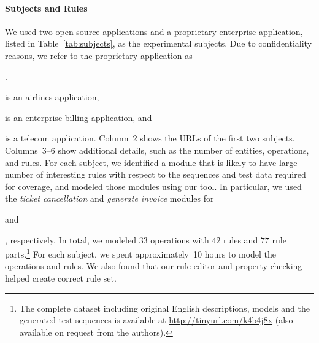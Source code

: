 
\paragraph*{Subjects and Rules} We used two open-source applications and a proprietary enterprise application,
listed in Table~\ref{tab:subjects}, as the experimental subjects. Due to
confidentiality reasons, we refer to the proprietary application as
\subject{App}. \subject{Cebu-pacific} is an airlines application,
\subject{jBilling} is an enterprise billing application, and \subject{App} is a
telecom application. Column~2 shows the URLs of the first two subjects.
Columns~3--6 show additional details, such as the number of entities,
operations, and rules. For each subject, we identified a module that is likely
to have large number of interesting rules with respect to the sequences and test
data required for coverage, and modeled those modules using our tool. In
particular, we used the \textit{ticket cancellation} and \textit{generate
  invoice} modules for \subject{Cebu-pacific} and \subject{jBilling},
respectively. In total, we modeled $33$ operations with $42$ rules and $77$ rule
parts.\footnote{\small The complete dataset including original English descriptions, models and the
  generated test sequences is available at \url{http://tinyurl.com/k4b4j8x}
  (also available on request from the authors).} For each subject, we spent
approximately~10 hours to model the operations and rules. We also found that
our rule editor and property checking helped create correct rule set.

